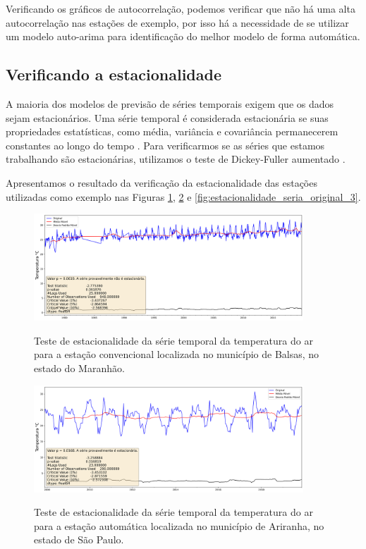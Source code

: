 Verificando os gráficos de autocorrelação, podemos verificar que não há uma alta autocorrelação nas estações de exemplo, por isso há a necessidade de se utilizar um modelo auto-arima para identificação do melhor modelo de forma automática.

\subsection{Verificando a estacionalidade}

A maioria dos modelos de previsão de séries temporais exigem que os dados sejam estacionários. Uma série temporal é considerada estacionária se suas propriedades estatísticas, como média, variância e covariância permanecerem constantes ao longo do tempo \cite{box2011time}. Para verificarmos se as séries que estamos trabalhando são estacionárias, utilizamos o teste de Dickey-Fuller aumentado \cite{said1984testing}. 

Apresentamos o resultado da verificação da estacionalidade das estações utilizadas como exemplo nas Figuras \ref{fig:estacionalidade_seria_original_1}, \ref{fig:estacionalidade_seria_original_2} e \ref{fig:estacionalidade_seria_original_3}.

\begin{figure}[H]
    \centering
    \caption{Teste de estacionalidade da série temporal da temperatura do ar para a estação convencional localizada no município de Balsas, no estado do Maranhão.}
    \includegraphics[width=0.9\textwidth]{figuras/dickey_fuller_raw_82768.png}
    \label{fig:estacionalidade_seria_original_1}
\end{figure}

\begin{figure}[H]
    \centering
    \caption{Teste de estacionalidade da série temporal da temperatura do ar para a estação automática localizada no município de Ariranha, no estado de São Paulo.}
    \includegraphics[width=0.9\textwidth]{figuras/dickey_fuller_raw_A736.png}
    \label{fig:estacionalidade_seria_original_2}
\end{figure}

